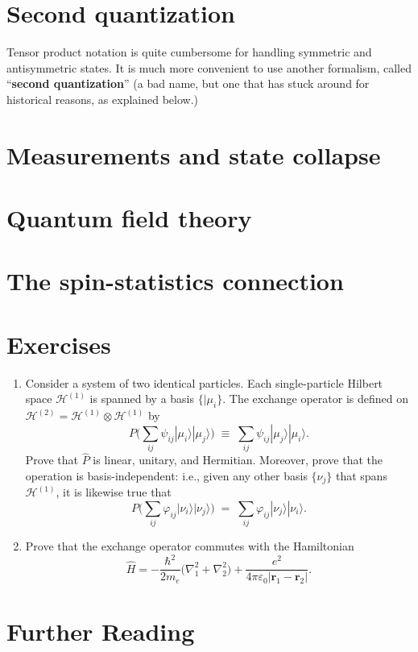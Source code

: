 \documentclass[pra,12pt]{revtex4}
\begin{document}
\section{Second quantization}

Tensor product notation is quite cumbersome for handling symmetric and
antisymmetric states.  It is much more convenient to use another
formalism, called ``\textbf{second quantization}'' (a bad name, but
one that has stuck around for historical reasons, as explained below.)


\section{Measurements and state collapse}

\section{Quantum field theory}
\label{sec:qft}

\section{The spin-statistics connection}
\label{sec:spinstats}

\section*{Exercises}

\begin{enumerate}
\item Consider a system of two identical particles.  Each
  single-particle Hilbert space $\mathscr{H}^{(1)}$ is spanned by a
  basis $\{|\mu_i\}$.  The exchange operator is defined on
  $\mathscr{H}^{(2)} = \mathscr{H}^{(1)} \otimes \mathscr{H}^{(1)}$ by
$$P \Big (\sum_{ij} \psi_{ij} |\mu_i\rangle|\mu_j\rangle \Big)
  \;\equiv\;  \sum_{ij} \psi_{ij} |\mu_j\rangle|\mu_i\rangle.$$
  Prove that $\hat{P}$ is linear, unitary, and Hermitian.  Moreover,
  prove that the operation is basis-independent: i.e., given any other
  basis $\{\nu_j\}$ that spans $\mathscr{H}^{(1)}$, it is likewise
  true that
$$P \Big (\sum_{ij} \varphi_{ij} |\nu_i\rangle|\nu_j\rangle \Big)
  \;=\;  \sum_{ij} \varphi_{ij} |\nu_j\rangle|\nu_i\rangle.$$
  \label{ex:1}

\item
  Prove that the exchange operator commutes with the Hamiltonian
$$\hat{H} = - \frac{\hbar^2}{2m_e} \Big(\nabla_1^2 + \nabla^2_2\Big) + \frac{e^2}{4\pi\varepsilon_0|\mathbf{r}_1 - \mathbf{r}_2|}.$$ \label{ex:2}
  
\end{enumerate}

\section*{Further Reading}

\end{document}
